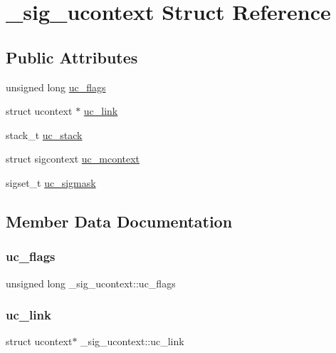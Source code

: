 \hypertarget{struct__sig__ucontext}{}\section{\+\_\+sig\+\_\+ucontext Struct Reference}
\label{struct__sig__ucontext}
\subsection*{Public Attributes}
\begin{DoxyCompactItemize}
\item 
unsigned long \mbox{\hyperlink{struct__sig__ucontext_a6b6901371b971d60c24a5da13313678d}{uc\+\_\+flags}}
\item 
struct ucontext $\ast$ \mbox{\hyperlink{struct__sig__ucontext_a809c5a7f88ef427178b6ec9609f332fc}{uc\+\_\+link}}
\item 
stack\+\_\+t \mbox{\hyperlink{struct__sig__ucontext_a60deb0ea689dc0a44d0c5065645427c8}{uc\+\_\+stack}}
\item 
struct sigcontext \mbox{\hyperlink{struct__sig__ucontext_a492ac4ba6ac49238b3f0f1bed8b91e85}{uc\+\_\+mcontext}}
\item 
sigset\+\_\+t \mbox{\hyperlink{struct__sig__ucontext_a64c81fb3959d146193d118c9ef90ab4f}{uc\+\_\+sigmask}}
\end{DoxyCompactItemize}


\subsection{Member Data Documentation}
\mbox{\label{struct__sig__ucontext_a6b6901371b971d60c24a5da13313678d}} 
\subsubsection{\texorpdfstring{uc\_flags}{uc\_flags}}
{\footnotesize\ttfamily unsigned long \+\_\+sig\+\_\+ucontext\+::uc\+\_\+flags}

\mbox{\label{struct__sig__ucontext_a809c5a7f88ef427178b6ec9609f332fc}} 
\subsubsection{\texorpdfstring{uc\_link}{uc\_link}}
{\footnotesize\ttfamily struct ucontext$\ast$ \+\_\+sig\+\_\+ucontext\+::uc\+\_\+link}

